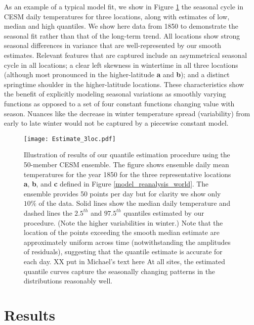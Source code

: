 \documentclass{ametsoc}
\newcommand\smallfigwidth{\columnwidth}
\begin{document}
 As an example of a typical model fit, we show in Figure \ref{Estimate} the seasonal cycle in CESM daily temperatures for three locations, along with estimates of low, median and high quantiles. We show here data from 1850 to demonstrate the seasonal fit rather than that of the long-term trend. All locations show strong seasonal differences in variance that are well-represented by our smooth estimates. Relevant features that are captured include an asymmetrical seasonal cycle in all locations; a clear left skewness in wintertime in all three locations (although most pronounced in the higher-latitude \textbf{a} and \textbf{b}); and a distinct springtime shoulder in the higher-latitude locations. These characteristics show the benefit of explicitly modeling seasonal variations as smoothly varying functions as opposed to a set of four constant functions changing value with season. Nuances like the decrease in winter temperature spread (variability) from early to late winter would not be captured by a piecewise constant model.

\begin{figure}[t]       %
\centerline{\texttt{[image: Estimate\_3loc.pdf]}}
\caption{\small{Illustration of results of our quantile estimation procedure using the 50-member CESM ensemble. The figure shows ensemble daily mean temperatures for the year 1850 for the three representative locations \textbf{a}, \textbf{b}, and \textbf{c} defined in Figure \ref{model_reanalysis_world}. The ensemble provides 50 points per day but for clarity we show only $10\%$ of the data. Solid lines show the median daily temperature and dashed lines the $2.5^{th}$ and $97.5^{th}$ quantiles estimated by our procedure. %
(Note the higher variabilities in winter.)  Note that the location of the points exceeding the smooth median estimate are approximately uniform across time (notwithstanding the amplitudes of residuals), suggesting that the quantile estimate is accurate for each day. XX put in Michael's text here
At all sites, the estimated quantile curves capture the seasonally changing patterns in the distributions reasonably well.
}} 

\label{Estimate}          %
\end{figure}

\section{Results}
\label{sec:results}
\end{document}
